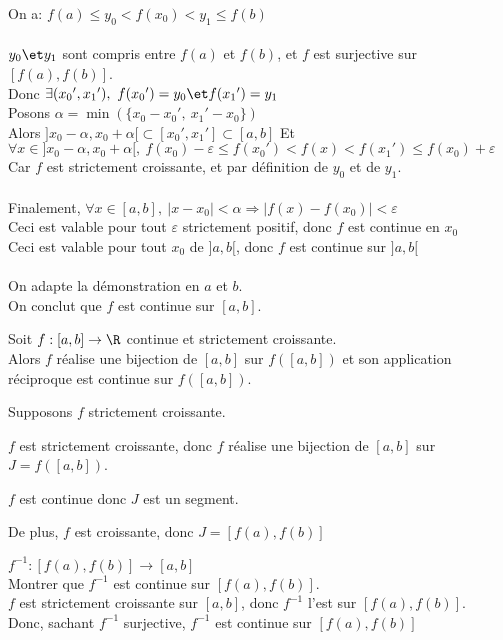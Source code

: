 \documentclass[12pt,twoside,a4paper]{article}
\begin{document}
\begin{preuve}
\begin{tab}
				On a: $f(a)\leqslant y_0<f(x_0)<y_1\leqslant f(b)$\\
				\\
				$y_0\et y_1$ sont compris entre $f(a)$ et $f(b)$, et $f$ est surjective sur $[f(a),f(b)]$.\\
				Donc $\exists ({x_0}',{x_1}'),\ f({x_0}')=y_0 \et f({x_1}')=y_1$\\
				Posons $\alpha = \min(\{x_0 - {x_0}',\ {x_1}' - x_0 \})$\\
				Alors $]x_0-\alpha,x_0+\alpha [\subset [{x_0}',{x_1}']\subset[a,b]$
				Et $\forall x\in ]x_0-\alpha,x_0+\alpha [,\ f(x_0)-\varepsilon\leqslant f({x_0}')<f(x)<f({x_1}')\leqslant f(x_0)+\varepsilon$\\
				Car $f$ est strictement croissante, et par d\'efinition de $y_0$ et de $y_1$.\\
				\\
				Finalement, $\forall x\in [a,b],\ |x-x_0|<\alpha\Rightarrow |f(x)-f(x_0)|<\varepsilon$\\
				Ceci est valable pour tout $\varepsilon$ strictement positif, donc $f$ est continue en $x_0$\\
				Ceci est valable pour tout $x_0$ de $]a,b[$, donc $f$ est continue sur $]a,b[$\\
				\\
				On adapte la d\'emonstration en $a$ et $b$.\\
				On conclut que $f$ est continue sur $[a,b]$.
			\end{tab}
		\end{preuve}
		\begin{coro}
			Soit $f:[a,b]\rightarrow\R$ continue et strictement croissante.\\
			Alors $f$ r\'ealise une bijection de $[a,b]$ sur $f([a,b])$ et son application r\'eciproque est continue sur $f([a,b])$.
		\end{coro}
		\newpage
		\begin{preuve}
			Supposons $f$ strictement croissante.
			\begin{liste}
				\item $f$ est strictement croissante, donc $f$ r\'ealise une bijection de $[a,b]$ sur $J=f([a,b])$.
				\item $f$ est continue donc $J$ est un segment.
				\item De plus, $f$ est croissante, donc $J=[f(a),f(b)]$
				\item $f^{-1}:[f(a),f(b)]\rightarrow[a,b]$\\
					Montrer que $f^{-1}$ est continue sur $[f(a),f(b)]$.\\
					$f$ est strictement croissante sur $[a,b]$, donc $f^{-1}$ l'est sur $[f(a),f(b)]$.\\
					Donc, sachant $f^{-1}$ surjective, $f^{-1}$ est continue sur $[f(a),f(b)]$
			\end{liste}
		\end{preuve}
\end{document}
